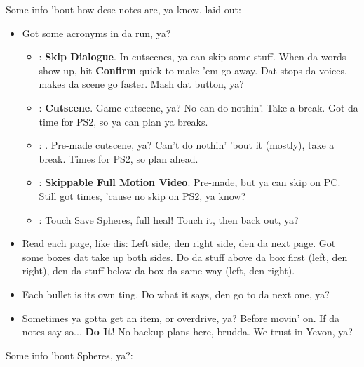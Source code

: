 Some info 'bout how dese notes are, ya know, laid out:

\begin{itemize}
    \item Got some acronyms in da run, ya?
    \begin{itemize}
        \item \sd: \textbf{Skip Dialogue}. In cutscenes, ya can skip some stuff. When da words show up, hit \textbf{Confirm} quick to make 'em go away. Dat stops da voices, makes da scene go faster. Mash dat button, ya?
        \item \cs: \textbf{Cutscene}. Game cutscene, ya? No can do nothin'. Take a break. Got da time for PS2, so ya can plan ya breaks.
        \item \fmv: . Pre-made cutscene, ya? Can't do nothin' 'bout it (mostly), take a break. Times for PS2, so plan ahead.
        \item \skippablefmv: \textbf{Skippable Full Motion Video}. Pre-made, but ya can skip on PC. Still got times, 'cause no skip on PS2, ya know?
        \item \save: Touch Save Spheres, full heal! Touch it, then back out, ya?
    \end{itemize}
    \item Read each page, like dis: Left side, den right side, den da next page. Got some boxes dat take up both sides. Do da stuff above da box first (left, den right), den da stuff below da box da same way (left, den right).
    \item Each bullet is its own ting. Do what it says, den go to da next one, ya?
    \item Sometimes ya gotta get an item, or overdrive, ya? Before movin' on. If da notes say so... \textbf{Do It}! No backup plans here, brudda. We trust in Yevon, ya?
\end{itemize}

Some info 'bout Spheres, ya?:

